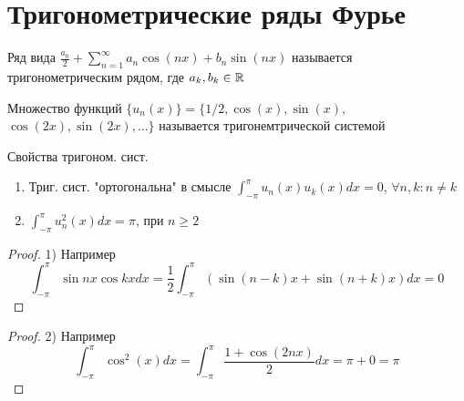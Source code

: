 \documentclass{article}
\begin{document}
\section{Тригонометрические ряды Фурье}
\begin{definition}
  Ряд вида $\frac{a_0}{2}+\sum_{n=1}^{\infty}a_n\cos(nx)+b_n\sin(nx)$
  называется тригонометрическим рядом, где $a_k,b_k\in\mathbb{R}$
\end{definition}
\begin{definition}
  Множество функций $\{u_n(x)\}=\{1/2, \cos(x), \sin(x),$ $ \cos(2x), \sin(2x),\dots\} $
  называется тригонемтрической системой
\end{definition}
Свойства тригоном. сист.
\begin{enumerate}
  \item Триг. сист. "ортогональна" в смысле $\int_{-\pi}^{\pi}u_n(x)u_k(x)dx=0$,
    $\forall n,k:n\neq k$
  \item $\int_{-\pi}^{\pi}u_n^{2}(x)dx=\pi$, при $n \ge 2$
\end{enumerate}
\begin{proof} 1) Например
      \[
        \int_{-\pi}^{\pi}\sin nx \cos kx dx = 
        \frac{1}{2}\int_{-\pi}^{\pi}(\sin(n-k)x+\sin(n+k)x)dx=0
      \]
\end{proof}
\begin{proof} 2)
  Например \[
    \int_{-\pi}^{\pi}\cos^{2}(x)dx=\int_{-\pi}^{\pi}\frac{1+\cos(2nx)}{2}dx=\pi + 0=\pi
  \]
\end{proof}
\end{document}
